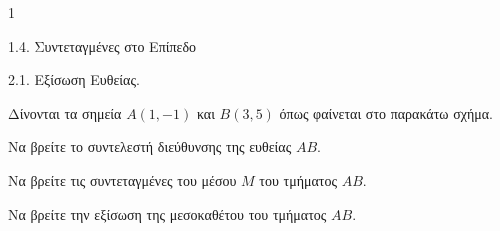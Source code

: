 \begin{ylh}{1}
    \item 1.4. Συντεταγμένες στο Επίπεδο
    \item 2.1. Εξίσωση Ευθείας.
\end{ylh}
\begin{figure}
    \centering
\end{figure}
Δίνονται τα σημεία $A(1,-1)$ και $B(3,5)$ όπως φαίνεται στο παρακάτω σχήμα.
\begin{alist}
    \item Να βρείτε το συντελεστή διεύθυνσης της ευθείας $AB$. 
    \item Να βρείτε τις συντεταγμένες του μέσου $M$ του τμήματος $AB$. 
    \item Να βρείτε την εξίσωση της μεσοκαθέτου του τμήματος $AB$. 
\end{alist}